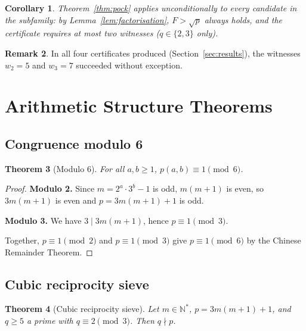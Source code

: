 \documentclass[11pt,a4paper]{article}
\theoremstyle{plain}
\newtheorem{theorem}{Theorem}[section]
\newtheorem{corollary}[theorem]{Corollary}
\theoremstyle{definition}
\newtheorem{remark}[theorem]{Remark}
\begin{document}
\begin{corollary}\label{cor:unconditional}
Theorem~\ref{thm:pock} applies \emph{unconditionally} to every candidate in
the subfamily: by Lemma~\ref{lem:factorisation}, $F > \sqrt{p}$ always holds,
and the certificate requires at most two witnesses ($q \in \{2, 3\}$ only).
\end{corollary}

\begin{remark}\label{rem:witnesses}
In all four certificates produced (Section~\ref{sec:results}), the witnesses
$w_2 = 5$ and $w_3 = 7$ succeeded without exception.
\end{remark}

\section{Arithmetic Structure Theorems}
\label{sec:arithmetic}

\subsection{Congruence modulo 6}

\begin{rigorousbox}
\begin{theorem}[Modulo 6]\label{thm:mod6}
For all $a, b \ge 1$, $p(a, b) \equiv 1 \pmod{6}$.
\end{theorem}
\end{rigorousbox}

\begin{proof}
\textbf{Modulo 2.} Since $m = 2^a \cdot 3^b - 1$ is odd, $m(m+1)$ is even, so
$3m(m+1)$ is even and $p = 3m(m+1) + 1$ is odd.

\textbf{Modulo 3.} We have $3 \mid 3m(m+1)$, hence $p \equiv 1 \pmod{3}$.

Together, $p \equiv 1 \pmod{2}$ and $p \equiv 1 \pmod{3}$ give
$p \equiv 1 \pmod{6}$ by the Chinese Remainder Theorem.
\end{proof}

\subsection{Cubic reciprocity sieve}

\begin{rigorousbox}
\begin{theorem}[Cubic reciprocity sieve]\label{thm:cubic}
Let $m \in \mathbb{N}^*$, $p = 3m(m+1) + 1$, and $q \ge 5$ a prime with
$q \equiv 2 \pmod{3}$. Then $q \nmid p$.
\end{theorem}
\end{rigorousbox}
\end{document}
